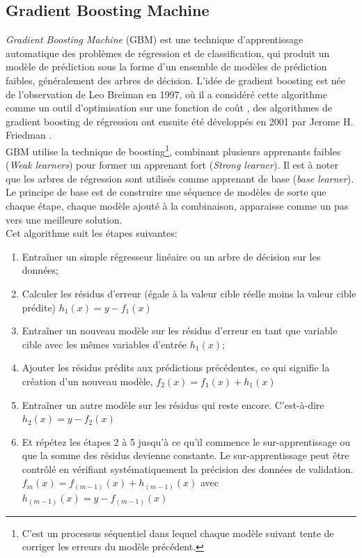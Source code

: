 \subsection{Gradient Boosting Machine}
\textit{Gradient Boosting Machine} (GBM) \citep{friedman2002stochastic} est une technique d'apprentissage automatique des problèmes de régression et de classification, qui produit un modèle de prédiction sous la forme d'un ensemble de modèles de prédiction faibles, généralement des arbres de décision. L'idée de gradient boosting est née de l'observation de Leo Breiman en 1997, où il a considéré cette algorithme comme un outil d'optimisation sur une fonction de coût \citep{breiman1997arcing}, des algorithmes de gradient boosting de régression ont ensuite été développés en 2001 par Jerome H. Friedman \citep{friedman2001greedy}.\\

GBM utilise la technique de boosting\footnote{C'est un processus séquentiel dans lequel chaque modèle suivant tente de corriger les erreurs du modèle précédent.}, combinant plusieurs apprenants faibles (\textit{Weak learners}) pour former un apprenant fort (\textit{Strong learner}). Il est à noter que les arbres de régression sont utilisés comme apprenant de base (\textit{base learner}). Le principe de base est de construire une séquence de modèles de sorte que chaque étape, chaque modèle ajouté à la combinaison, apparaisse comme un pas vers une meilleure solution.\\


Cet algorithme suit les étapes suivantes:
\begin{enumerate}
\item Entraîner un simple régresseur linéaire ou un arbre de décision sur les données;
\item Calculer les résidus d'erreur (égale à la valeur cible réelle moins la valeur cible prédite)
$h_1(x)=y-f_1(x)$
\item Entraîner un nouveau modèle sur les résidus d'erreur en tant que variable cible avec les mêmes variables d'entrée $h_1(x)$;
\item Ajouter les résidus prédits aux prédictions précédentes, ce qui signifie la création d'un nouveau modèle, 
$f_2(x)=f_1(x)+h_1(x)$
\item Entraîner un autre modèle sur les résidus qui reste encore. C’est-à-dire $h_2(x)=y-f_2(x)$
\item Et répétez les étapes 2 à 5 jusqu'à ce qu'il commence le sur-apprentissage ou que la somme des résidus devienne constante. Le sur-apprentissage peut être contrôlé en vérifiant systématiquement la précision des données de validation.
$ f_m(x)=f_{(m-1)}(x)+ h_{(m-1)}(x)$ avec $h_{(m-1)}(x)=y- f_{(m-1)}(x)$
\end{enumerate}

